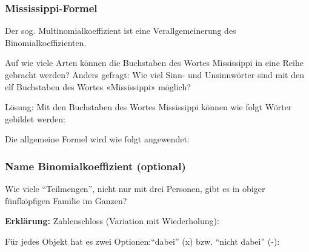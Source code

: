 \subsubsection{Mississippi-Formel}
Der sog. Multinomialkoeffizient ist eine Verallgemeinerung des Binomialkoeffizienten.

Auf wie viele Arten können die Buchstaben des Wortes Mississippi in
eine Reihe gebracht werden? Anders gefragt: Wie viel Sinn- und
Unsinnwörter sind mit den elf Buchstaben des Wortes «Mississippi»
möglich?

Lösung: Mit den Buchstaben des Wortes
{\color{red}M}{\color{blue}i}{\color{orange}ss}{\color{blue}i}{\color{orange}ss}{\color{blue}i}{\color{violet}pp}{\color{blue}i}
können wie folgt Wörter gebildet werden:


Die allgemeine Formel wird wie folgt angewendet:

\subsubsection{Name Binomialkoeffizient (optional)}

 Wie viele ``Teilmengen'', nicht nur mit drei Personen, gibt es in obiger
  fünfköpfigen Familie im Ganzen?

    

\textbf{Erklärung:} Zahlenschloss (Variation mit Wiederholung):

Für jedes Objekt hat es zwei Optionen:``dabei'' (x) bzw. ``nicht dabei'' (-):

